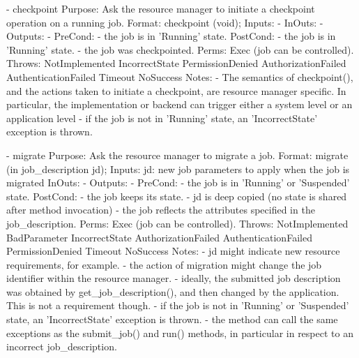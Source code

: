 \begin{myspec}
 
    - checkpoint
      Purpose:  Ask the resource manager to initiate a checkpoint
                operation on a running job.
      Format:   checkpoint         (void);
      Inputs:   -
      InOuts:   -
      Outputs:  -
      PreCond:  - the job is in 'Running' state.
      PostCond: - the job is in 'Running' state.
                - the job was checkpointed.
      Perms:    Exec (job can be controlled).
      Throws:   NotImplemented
                IncorrectState
                PermissionDenied
                AuthorizationFailed
                AuthenticationFailed
                Timeout
                NoSuccess
      Notes:    - The semantics of checkpoint(), and the actions
                  taken to initiate a checkpoint, are resource
                  manager specific.  In particular, the
                  implementation or backend can trigger either 
                  a system level or an application level
                - if the job is not in 'Running' state, 
                  an 'IncorrectState' exception is thrown.
 
 
    - migrate
      Purpose:  Ask the resource manager to migrate a job.
      Format:   migrate            (in job_description jd);
      Inputs:   jd:                 new job parameters to apply
                                    when the job is migrated
      InOuts:   -
      Outputs:  -
      PreCond:  - the job is in 'Running' or 'Suspended' state.
      PostCond: - the job keeps its state.
                - jd is deep copied (no state is shared
                  after method invocation)
                - the job reflects the attributes specified in
                  the job_description.
      Perms:    Exec (job can be controlled).
      Throws:   NotImplemented
                BadParameter
                IncorrectState
                AuthorizationFailed
                AuthenticationFailed
                PermissionDenied
                Timeout
                NoSuccess
      Notes:    - jd might indicate new resource 
                  requirements, for example.
                - the action of migration might change the job 
                  identifier within the resource manager.
                - ideally, the submitted job description was
                  obtained by get_job_description(), and then
                  changed by the application.  This is not a
                  requirement though.
                - if the job is not in 'Running' or 'Suspended' 
                  state, an 'IncorrectState' exception is thrown.
                - the method can call the same exceptions as
                  the submit_job() and run() methods, in
                  particular in respect to an incorrect
                  job_description.
 

\end{myspec}
